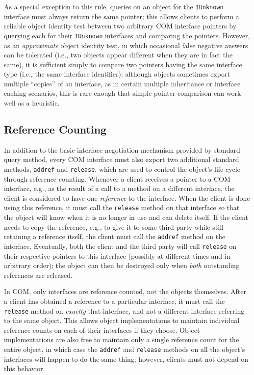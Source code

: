 As a special exception to this rule,
queries on an object for the \texttt{IUnknown} interface
must always return the same pointer;
this allows clients to perform a reliable object identity test
between two arbitrary COM interface pointers
by querying each for their \texttt{IUnknown} interfaces
and comparing the pointers.
However, as an \emph{approximate} object identity test,
in which occasional false negative answers can be tolerated
(i.e., two objects appear different when they are in fact the same),
it is sufficient simply to compare
two pointers having the same interface type
(i.e., the same interface identifier):
although objects sometimes export multiple ``copies'' of an interface,
as in certain multiple inheritance or interface caching scenarios,
this is rare enough that simple pointer comparison
can work well as a heuristic.

\subsection{Reference Counting}

In addition to the basic interface negotiation mechanism
provided by standard query method,
every COM interface must also export two additional standard methods,
\texttt{addref} and \texttt{release},
which are used to control the object's life cycle
through reference counting.
Whenever a client receives a pointer to a COM interface,
e.g., as the result of a call to a method on a different interface,
the client is considered to have one \emph{reference} to the interface.
When the client is done using this reference,
it must call the \texttt{release} method on that interface
so that the object will know when it is no longer in use
and can delete itself.
If the client needs to copy the reference,
e.g., to give it to some third party
while still retaining a reference itself,
the client must call the \texttt{addref} method on the interface.
Eventually,
both the client and the third party
will call \texttt{release} on their respective pointers to this interface
(possibly at different times and in arbitrary order);
the object can then be destroyed
only when \emph{both} outstanding references are released.

In COM, only interfaces are reference counted, not the objects themselves.
After a client has obtained a reference to a particular interface,
it must call the \texttt{release} method on \emph{exactly} that interface,
and not a different interface referring to the same object.
This allows object implementations
to maintain individual reference counts on each of their interfaces
if they choose.
Object implementations are also free to maintain
only a single reference count for the entire object,
in which case the \texttt{addref} and \texttt{release} methods
on all the object's interfaces will happen to do the same thing;
however, clients must not depend on this behavior.

